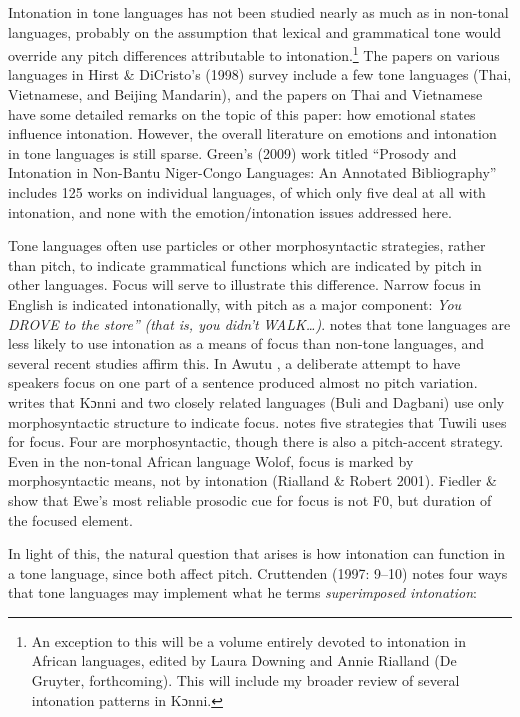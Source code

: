 \documentclass[output=paper]{langsci/langscibook}
\begin{document}
Intonation in tone languages has not been studied nearly as much as in non-tonal languages, probably on the assumption that lexical and grammatical tone would override any pitch differences attributable to intonation.\footnote{ An exception to this will be a volume entirely devoted to intonation in African languages, edited by Laura Downing and Annie Rialland (De Gruyter, forthcoming). This will include my broader review of several intonation patterns in Kɔnni.} The papers on various languages in Hirst \& DiCristo’s (1998) survey include a few tone languages (Thai, Vietnamese, and Beijing Mandarin), and the papers on Thai and Vietnamese have some detailed remarks on the topic of this paper: how emotional states influence intonation. However, the overall literature on emotions and intonation in tone languages is still sparse. Green’s (2009) work titled “Prosody and Intonation in Non-Bantu Niger-Congo Languages: An Annotated Bibliography” includes 125 works on individual languages, of which only five deal at all with intonation, and none with the emotion/intonation issues addressed here. 

Tone languages often use particles or other morphosyntactic strategies, rather than pitch, to indicate grammatical functions which are indicated by pitch in other languages. Focus will serve to illustrate this difference. Narrow focus in English is indicated intonationally, with pitch as a major component:  \emph{You DROVE to the store” }\emph{\textup{(that is, you didn’t}}\emph{ WALK…}\emph{\textup{)}}. \citet[73]{Cruttenden1997} notes that tone languages are less likely to use intonation as a means of focus than non-tone languages, and several recent studies affirm this. In Awutu \citep{Lomotey2014}, a deliberate attempt to have speakers focus on one part of a sentence produced almost no pitch variation. \citet{Schwarz2009} writes that Kɔnni and two closely related languages (Buli and Dagbani) use only morphosyntactic structure to indicate focus. \citet{Harley2009} notes five strategies that Tuwili uses for focus. Four are morphosyntactic, though there is also a pitch-accent strategy. Even in the non-tonal African language Wolof, focus is marked by morphosyntactic means, not by intonation (Rialland \& Robert 2001).  Fiedler \& \citet{Jannedy2013} show that Ewe’s most reliable prosodic cue for focus is not F0, but duration of the focused element.

In light of this, the natural question that arises is how intonation can function in a tone language, since both affect pitch. Cruttenden (1997: 9–10) notes four ways that tone languages may implement what he terms \emph{superimposed intonation}:
\end{document}
